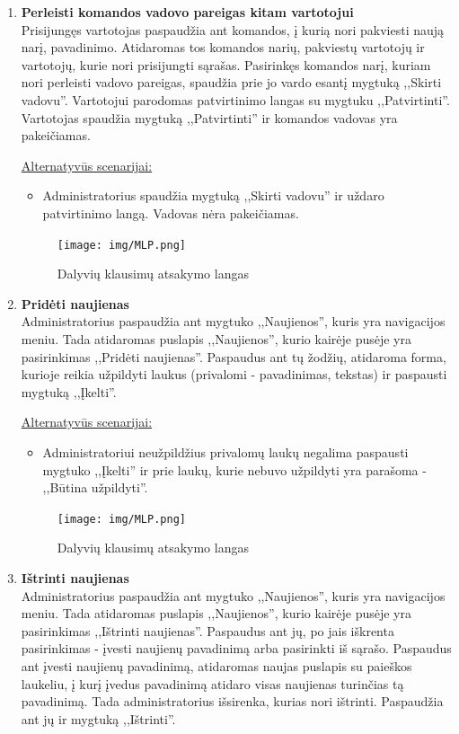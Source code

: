 \documentclass{VUMIFPSkursinis}
\begin{document}
\begin{enumerate} [label = \textbf{U\arabic*.}]
			\item \textbf{Perleisti komandos vadovo pareigas kitam vartotojui}   \\
					Prisijungęs vartotojas paspaudžia ant komandos, į kurią nori pakviesti naują narį, pavadinimo. Atidaromas tos komandos narių, pakviestų vartotojų ir vartotojų, kurie nori prisijungti sąrašas. Pasirinkęs komandos narį, kuriam nori perleisti vadovo pareigas, spaudžia prie jo vardo esantį mygtuką ,,Skirti vadovu''. Vartotojui parodomas patvirtinimo langas su mygtuku ,,Patvirtinti''. Vartotojas spaudžia mygtuką ,,Patvirtinti'' ir komandos vadovas yra pakeičiamas.
					
					\underline{Alternatyvūs scenarijai:}
					\begin{itemize}
						\item Administratorius spaudžia mygtuką ,,Skirti vadovu'' ir uždaro patvirtinimo langą. Vadovas nėra pakeičiamas.
					\end{itemize}
				
				\begin{figure}[H]
					\centering
					\texttt{[image: img/MLP.png]}
					\caption{Dalyvių klausimų atsakymo langas}
					\label{fig:atsakyti-klausimus}
				\end{figure}
								
			\item \textbf{Pridėti naujienas}   \\
					Administratorius paspaudžia ant mygtuko ,,Naujienos'', kuris yra navigacijos meniu. Tada atidaromas puslapis ,,Naujienos'', kurio kairėje pusėje yra pasirinkimas ,,Pridėti naujienas''. Paspaudus ant tų žodžių, atidaroma forma, kurioje reikia užpildyti laukus (privalomi - pavadinimas, tekstas) ir paspausti mygtuką ,,Įkelti''.
					
					\underline{Alternatyvūs scenarijai:}
					\begin{itemize}
						\item Administratoriui neužpildžius privalomų laukų negalima paspausti mygtuko ,,Įkelti'' ir prie laukų, kurie nebuvo užpildyti yra parašoma - ,,Būtina užpildyti''.
					\end{itemize}
				
				\begin{figure}[H]
					\centering
					\texttt{[image: img/MLP.png]}
					\caption{Dalyvių klausimų atsakymo langas}
					\label{fig:atsakyti-klausimus}
				\end{figure}
					
			\item \textbf{Ištrinti naujienas}   \\
					Administratorius paspaudžia ant mygtuko ,,Naujienos'', kuris yra navigacijos meniu. Tada atidaromas puslapis ,,Naujienos'', kurio kairėje pusėje yra pasirinkimas ,,Ištrinti naujienas''. Paspaudus ant jų, po jais iškrenta pasirinkimas - įvesti naujienų pavadinimą arba pasirinkti iš sąrašo. Paspaudus ant įvesti naujienų pavadinimą, atidaromas naujas puslapis su paieškos laukeliu, į kurį įvedus pavadinimą atidaro visas naujienas turinčias tą pavadinimą. Tada administratorius išsirenka, kurias nori ištrinti. Paspaudžia ant jų ir mygtuką ,,Ištrinti''.
					

\end{enumerate}
\end{document}

